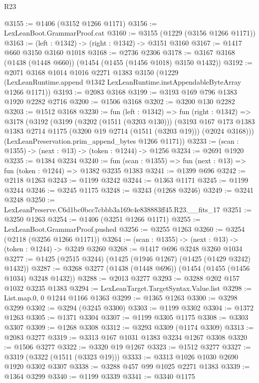\begin{lexlean}{R23}
\begin{coremodule}
@3155 := @1406 (@3152 @1266 @1171)
@3156 := LexLeanBoot.GrammarProof.cat
@3160 := @3155 (@1229 (@3156 @1266 @1171))
@3163 := (left : @1342) -> (right : @1342) -> @3151 @3160
@3167 := @1417 @660 @3150 @3160 @1018
@3168 := @2736 @2306
@3178 := @3167 @3168 (@1438 (@1448 @660)) (@1454 (@1455 (@1456 @1018) @3150 @1432))
@3192 := @2071
    @3168
    @1014
    @1016
    @2271
    @1383
    @3150
    (@1229 (LexLeanRuntime.append @1342 LexLeanRuntime.instAppendableByteArray @1266 @1171))
@3193 := @2083 @3168
@3199 := @3193 @169 @796 @1383 @1920 @2282 @2716
@3200 := @1506 @3168
@3202 := @3200 @130 @2282
@3203 := @1512 @3168
@3230 := fun (left : @1342) =>
  fun (right : @1342) =>
  @3178
    (@3192
      (@3199
        (@3202 (@1511 (@3203 @130)))
        (@3193
          @167
          @173
          @1383
          @1383
          @2714
          @1175
          (@3200 @19 @2714 (@1511 (@3203 @19)))
          (@2024 @3168)))
      (LexLeanPreservation.prim_append_bytes @1266 @1171))
@3233 := (scan : @1355) -> (next : @13) -> (token : @1244) -> @1256
@3234 := @2691 @1920
@3235 := @1384 @3234
@3240 := fun (scan : @1355) => fun (next : @13) => fun (token : @1244) => @1382 @3235 @1383
@3241 := @1399 @696
@3242 := @2118 @1263
@3243 := @1199 @3242
@3244 := @1363 @1171
@3245 := @1199 @3244
@3246 := @3245 @1175
@3248 := @3243 (@1268 @3246)
@3249 := @3241 @3248
@3250 := LexLeanPreserve.C6d1bc0bcc7cbbb3a169c4e838883ff45.R23.__fits_17
@3251 := @3250 @1263
@3254 := @1406 (@3251 @1266 @1171)
@3255 := LexLeanBoot.GrammarProof.pushed
@3256 := @3255 @1263
@3260 := @3254 (@2118 (@3256 @1266 @1171))
@3264 := (scan : @1355) -> (next : @13) -> (token : @1244) -> @3249 @3260
@3268 := @1417 @696 @3248 @3260 @1034
@3277 := @1425 (@2515 @3244) (@1425 (@1946 @1267) (@1425 (@1429 @3242) @1432))
@3287 := @3268 @3277 (@1438 (@1448 @696)) (@1454 (@1455 (@1456 @1034) @3248 @1432))
@3288 := @2013 @3277
@3293 := @3288 @202 @157 @1032 @3235 @1383
@3294 := LexLeanTarget.TargetSyntax.Value.list
@3298 := List.map.{0, 0} @1244 @1166 @1363
@3299 := @1365 @1263
@3300 := @3298 @3299
@3302 := @3294 (@3245 @3300)
@3303 := @1199 @3302
@3304 := @1372 @1263
@3305 := @1371 @3304
@3307 := @1199 @3305 @1175
@3308 := @3303 @3307
@3309 := @1268 @3308
@3312 := @3293 @3309 (@1174 @3309)
@3313 := @2083 @3277
@3319 := @3313 @167 @1031 @1383 @3234 @1267 @3308
@3320 := @1506 @3277
@3322 := @3320 @19 @1267
@3323 := @1512 @3277
@3327 := @3319 (@3322 (@1511 (@3323 @19)))
@3333 := @3313 @1026 @1030 @2690 @1920 @3302 @3307
@3338 := @3288 @457 @99 @1025 @2271 @1383
@3339 := @1364 @3299
@3340 := @1199 @3339
@3341 := @3340 @1175

\end{coremodule}
\end{lexlean}
